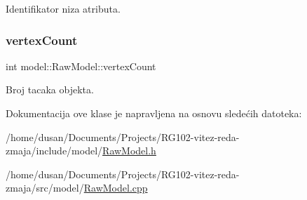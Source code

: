 Identifikator niza atributa. 

\mbox{\label{classmodel_1_1RawModel_a76a976df29d34a1d0f7a7e8f42a4477c}} 
\subsubsection{\texorpdfstring{vertex\+Count}{vertexCount}}
{\footnotesize\ttfamily int model\+::\+Raw\+Model\+::vertex\+Count\hspace{0.3cm}{\ttfamily [private]}}



Broj tacaka objekta. 



Dokumentacija ove klase je napravljena na osnovu sledećih datoteka\+:\begin{DoxyCompactItemize}
\item 
/home/dusan/\+Documents/\+Projects/\+R\+G102-\/vitez-\/reda-\/zmaja/include/model/\hyperlink{RawModel_8h}{Raw\+Model.\+h}\item 
/home/dusan/\+Documents/\+Projects/\+R\+G102-\/vitez-\/reda-\/zmaja/src/model/\hyperlink{RawModel_8cpp}{Raw\+Model.\+cpp}\end{DoxyCompactItemize}
